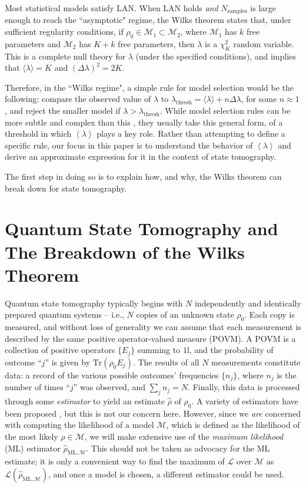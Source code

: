 \documentclass[aps,pra, twocolumn]{revtex4-1}
\newcommand{\M}{\mathcal{M}}
\newcommand{\Tr}{\mathrm{Tr}}
\newcommand{\cL}{\mathcal{L}}
\newcommand{\Id}{\mathbb{I}}
\newcommand{\expect}[1]{\ensuremath{\left\langle#1\right\rangle}}
\def\Id{1\!\mathrm{l}}
\newcommand{\rhohat}{\hat{\rho}}
\newcommand{\rhoML}[1]{\rhohat_{\scriptscriptstyle{\mathrm{ML},#1}}}
\begin{document}
Most statistical models satisfy LAN.  When LAN holds \emph{and} $N_{\mathrm{samples}}$ is large enough to reach the ``asymptotic" regime, the Wilks theorem states that, under sufficient regularity conditions, if $\rho_{0}\in \M_{1}\subset \M_{2}$, where $\M_{1}$ has $k$ free parameters and $\M_{2}$ has $K+k$ free parameters, then $\lambda$ is a $\chi^{2}_{K}$ random variable.  This is a complete null theory for $\lambda$ (under the specified conditions), and implies that $\langle \lambda \rangle = K$ and $(\Delta \lambda)^{2} = 2K$.

Therefore, in the ``Wilks regime", a simple rule for model selection would be the following: compare the observed value of $\lambda$ to $\lambda_{\mathrm{thresh}} = \langle \lambda \rangle + n\Delta \lambda$, for some $n \approx 1$, and reject the smaller model if $\lambda > \lambda_{\mathrm{thresh}}$.  While model selection rules can be more subtle and complex than this , they usually take this general form, of a threshold in which $\expect{\lambda}$ plays a key role.  Rather than attempting to define a specific rule, our focus in this paper is to understand the behavior of $\expect{\lambda}$ and derive an approximate expression for it in the context of state tomography.

The first step in doing so is to explain how, and why, the Wilks theorem can break down for state tomography.

\section{Quantum State Tomography and The Breakdown of the Wilks Theorem}
\label{sec:qstmodelselection}
Quantum state tomography typically begins with $N$ independently and identically prepared quantum systems -- i.e., $N$ copies of an unknown state $\rho_{0}$.  Each copy is measured, and without loss of generality we can assume that each measurement is described by the same positive operator-valued measure (POVM).  A POVM is a collection of positive operators $\{E_j\}$ summing to $\Id$, and the probability of outcome ``$j$'' is given by $\Tr(\rho_0 E_j)$.  The results of all $N$ measurements constitute data:  a record of the various possible outcomes' frequencies $\{n_{j}\}$, where $n_{j}$ is the number of times ``$j$'' was observed, and $\sum_{j}n_{j} = N$.  Finally, this data is processed through some \emph{estimator} to yield an estimate $\hat{\rho}$ of $\rho_0$.  A variety of estimators have been proposed \cite{Vogel1989,Hradil1997,JamesPRA2001,Blume-Kohout2010b,Blume-Kohout2010,Zhu2014a,Ferrie2016}, but this is not our concern here.  However, since we \emph{are} concerned with computing the likelihood of a model $\M$, which is defined as the likelihood of the most likely $\rho\in\M$, we will make extensive use of the \emph{maximum likelihood} (ML) estimator $\rhoML{\M}$.  This should not be taken as advocacy for the ML estimate; it is only a convenient way to find the maximum of $\cL$ over $\M$ as $\mathcal{L}(\rhoML{\M})$, and once a model is chosen, a different estimator could be used.
\end{document}
